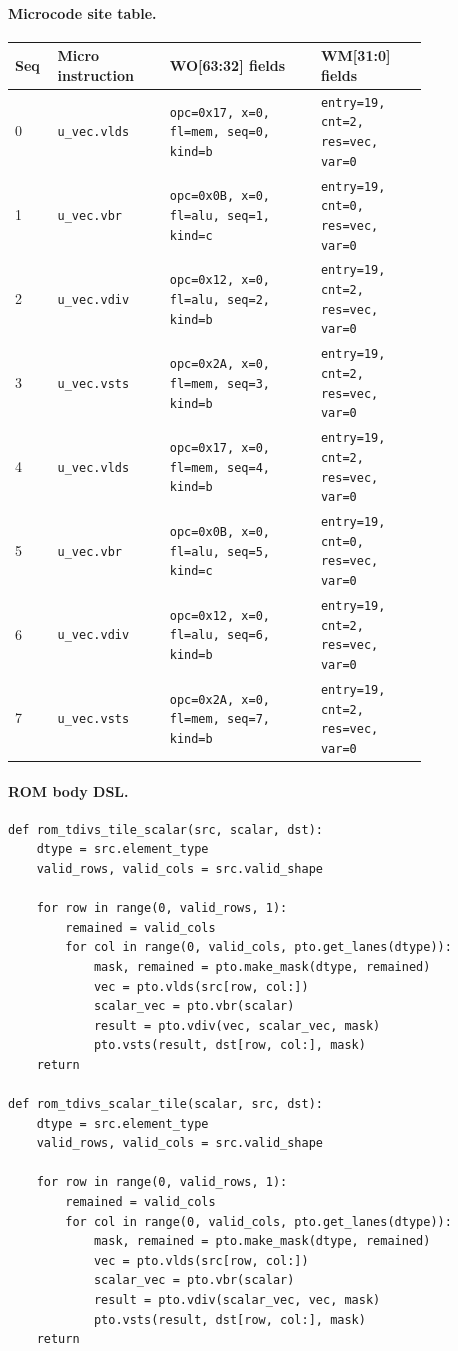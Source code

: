 \paragraph{Microcode site table.}
{\scriptsize
\begin{longtable}{@{}R{0.055\linewidth}L{0.23\linewidth}L{0.31\linewidth}L{0.22\linewidth}@{}}
\toprule
Seq & Micro instruction & WO[63:32] fields & WM[31:0] fields \\
 & \texttt{u\_vec.vlds} & \texttt{opc=0x17, x=0, fl=mem, seq=0, kind=b} & \texttt{entry=19, cnt=2, res=vec, var=0} \\
1 & \texttt{u\_vec.vbr} & \texttt{opc=0x0B, x=0, fl=alu, seq=1, kind=c} & \texttt{entry=19, cnt=0, res=vec, var=0} \\
2 & \texttt{u\_vec.vdiv} & \texttt{opc=0x12, x=0, fl=alu, seq=2, kind=b} & \texttt{entry=19, cnt=2, res=vec, var=0} \\
3 & \texttt{u\_vec.vsts} & \texttt{opc=0x2A, x=0, fl=mem, seq=3, kind=b} & \texttt{entry=19, cnt=2, res=vec, var=0} \\
4 & \texttt{u\_vec.vlds} & \texttt{opc=0x17, x=0, fl=mem, seq=4, kind=b} & \texttt{entry=19, cnt=2, res=vec, var=0} \\
5 & \texttt{u\_vec.vbr} & \texttt{opc=0x0B, x=0, fl=alu, seq=5, kind=c} & \texttt{entry=19, cnt=0, res=vec, var=0} \\
6 & \texttt{u\_vec.vdiv} & \texttt{opc=0x12, x=0, fl=alu, seq=6, kind=b} & \texttt{entry=19, cnt=2, res=vec, var=0} \\
7 & \texttt{u\_vec.vsts} & \texttt{opc=0x2A, x=0, fl=mem, seq=7, kind=b} & \texttt{entry=19, cnt=2, res=vec, var=0} \\
\bottomrule
\end{longtable}
}
\paragraph{ROM body DSL.}
\begin{lstlisting}[style=ptocode]
def rom_tdivs_tile_scalar(src, scalar, dst):
    dtype = src.element_type
    valid_rows, valid_cols = src.valid_shape

    for row in range(0, valid_rows, 1):
        remained = valid_cols
        for col in range(0, valid_cols, pto.get_lanes(dtype)):
            mask, remained = pto.make_mask(dtype, remained)
            vec = pto.vlds(src[row, col:])
            scalar_vec = pto.vbr(scalar)
            result = pto.vdiv(vec, scalar_vec, mask)
            pto.vsts(result, dst[row, col:], mask)
    return

def rom_tdivs_scalar_tile(scalar, src, dst):
    dtype = src.element_type
    valid_rows, valid_cols = src.valid_shape

    for row in range(0, valid_rows, 1):
        remained = valid_cols
        for col in range(0, valid_cols, pto.get_lanes(dtype)):
            mask, remained = pto.make_mask(dtype, remained)
            vec = pto.vlds(src[row, col:])
            scalar_vec = pto.vbr(scalar)
            result = pto.vdiv(scalar_vec, vec, mask)
            pto.vsts(result, dst[row, col:], mask)
    return
\end{lstlisting}
\Needspace{0.34\textheight}
